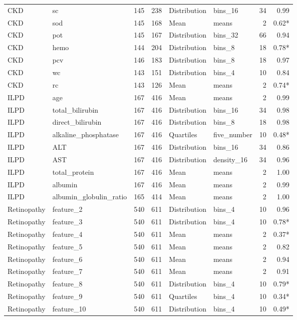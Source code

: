 \begin{longtable}{p{1.95cm}p{4.25cm}rrp{1.7cm}p{2.1cm}rr}
CKD & sc & 145 & 238 & Distribution & bins\_16 & 34 & 0.99\\
CKD & sod & 145 & 168 & Mean & means & 2 & 0.62*\\
CKD & pot & 145 & 167 & Distribution & bins\_32 & 66 & 0.94\\
CKD & hemo & 144 & 204 & Distribution & bins\_8 & 18 & 0.78*\\
CKD & pcv & 146 & 183 & Distribution & bins\_8 & 18 & 0.97\\
CKD & wc & 143 & 151 & Distribution & bins\_4 & 10 & 0.84\\
CKD & rc & 143 & 126 & Mean & means & 2 & 0.74*\\
ILPD & age & 167 & 416 & Mean & means & 2 & 0.99\\
ILPD & total\_bilirubin & 167 & 416 & Distribution & bins\_16 & 34 & 0.98\\
ILPD & direct\_bilirubin & 167 & 416 & Distribution & bins\_8 & 18 & 0.98\\
ILPD & alkaline\_phosphatase & 167 & 416 & Quartiles & five\_number & 10 & 0.48*\\
ILPD & ALT & 167 & 416 & Distribution & bins\_16 & 34 & 0.86\\
ILPD & AST & 167 & 416 & Distribution & density\_16 & 34 & 0.96\\
ILPD & total\_protein & 167 & 416 & Mean & means & 2 & 1.00\\
ILPD & albumin & 167 & 416 & Mean & means & 2 & 0.99\\
ILPD & albumin\_globulin\_ratio & 165 & 414 & Mean & means & 2 & 1.00\\
Retinopathy & feature\_2 & 540 & 611 & Distribution & bins\_4 & 10 & 0.96\\
Retinopathy & feature\_3 & 540 & 611 & Distribution & bins\_4 & 10 & 0.78*\\
Retinopathy & feature\_4 & 540 & 611 & Mean & means & 2 & 0.37*\\
Retinopathy & feature\_5 & 540 & 611 & Mean & means & 2 & 0.82\\
Retinopathy & feature\_6 & 540 & 611 & Mean & means & 2 & 0.94\\
Retinopathy & feature\_7 & 540 & 611 & Mean & means & 2 & 0.91\\
Retinopathy & feature\_8 & 540 & 611 & Distribution & bins\_4 & 10 & 0.79*\\
Retinopathy & feature\_9 & 540 & 611 & Quartiles & bins\_4 & 10 & 0.34*\\
Retinopathy & feature\_10 & 540 & 611 & Distribution & bins\_4 & 10 & 0.49*\\

\end{longtable}
